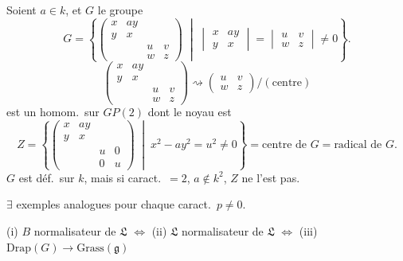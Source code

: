 \documentclass[11pt,a4paper]{article}
\begin{document}
Soient $a \in k$, et $G$ le groupe
\[
G = \left\lbrace
\begin{pmatrix} x & ay & & \\ y & x & & \\ & & u & v \\ & & w & z \end{pmatrix}
\;\middle|\;
\begin{vmatrix} x & ay \\ y & x \end{vmatrix}
= \begin{vmatrix} u & v \\ w & z \end{vmatrix} \neq 0
\right\rbrace .
\]
\[
\begin{pmatrix} x & ay & & \\ y & x & & \\ & & u & v \\ & & w & z \end{pmatrix}
\rightsquigarrow
\begin{pmatrix} u & v \\ w & z \end{pmatrix} \big/ (\text{centre})
\]
est un homom.\ sur $GP(2)$ dont le noyau est
\[
Z = \left\lbrace
\begin{pmatrix} x & ay & & \\ y & x & & \\ & & u & 0 \\ & & 0 & u \end{pmatrix}
\;\middle|\;
x^2 - ay^2 = u^2 \neq 0
\right\rbrace
= \text{centre de } G = \text{radical de } G .
\]
$G$ est déf.\ sur $k$, mais si caract.\ $= 2$, $a \notin k^2$, $Z$ ne
l'est pas.

$\exists$ exemples analogues pour chaque caract.\ $p \neq 0$.



(i) $B$ normalisateur de $\mathfrak{L}$ $\iff$ (ii) $\mathfrak{L}$
normalisateur de $\mathfrak{L}$ $\iff$ (iii)
$\mathrm{Drap}(G) \to \mathrm{Grass}(\mathfrak{g})$ 
\end{document}
